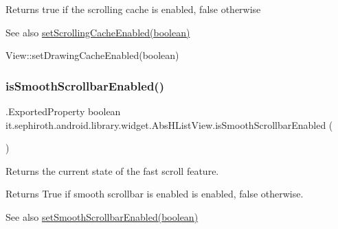 \begin{DoxyReturn}{Returns}
true if the scrolling cache is enabled, false otherwise
\end{DoxyReturn}
\begin{DoxySeeAlso}{See also}
\hyperlink{classit_1_1sephiroth_1_1android_1_1library_1_1widget_1_1_abs_h_list_view_ae0d33f428ee63d245cc85bc7a4616125}{set\+Scrolling\+Cache\+Enabled(boolean)} 

View\+::set\+Drawing\+Cache\+Enabled(boolean) 
\end{DoxySeeAlso}
\mbox{\label{classit_1_1sephiroth_1_1android_1_1library_1_1widget_1_1_abs_h_list_view_a24594cf8c5771568d8ae09d750e2378e}} 
\subsubsection{\texorpdfstring{is\+Smooth\+Scrollbar\+Enabled()}{isSmoothScrollbarEnabled()}}
{\footnotesize\ttfamily .Exported\+Property boolean it.\+sephiroth.\+android.\+library.\+widget.\+Abs\+H\+List\+View.\+is\+Smooth\+Scrollbar\+Enabled (\begin{DoxyParamCaption}{ }\end{DoxyParamCaption})}

Returns the current state of the fast scroll feature.

\begin{DoxyReturn}{Returns}
True if smooth scrollbar is enabled is enabled, false otherwise.
\end{DoxyReturn}
\begin{DoxySeeAlso}{See also}
\hyperlink{classit_1_1sephiroth_1_1android_1_1library_1_1widget_1_1_abs_h_list_view_a926b68b154bc94af5b3329aceff1d0fc}{set\+Smooth\+Scrollbar\+Enabled(boolean)} 
\end{DoxySeeAlso}
\mbox{\label{classit_1_1sephiroth_1_1android_1_1library_1_1widget_1_1_abs_h_list_view_a2c11ea6ae5c9fab59864dba4661f0329}} 

